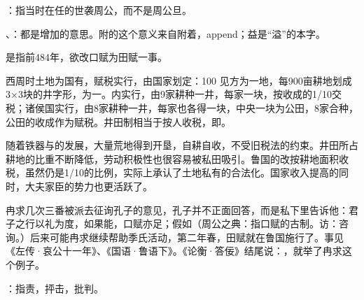 {
\item {}：指当时在任的世袭周公，而不是周公旦。
\item {}、：都是增加的意思。附的这个意义来自附着，append；益是“溢”的本字。

是指前484年，欲改口赋为田赋一事。

西周时土地为国有，赋税实行，由国家划定：100 见方为一地，每900亩耕地划成3×3块的井字形，为一。内实行，由9家耕种一井，每家一块，按收成的1/10交税；诸侯国实行，由8家耕种一井，每家也各得一块，中央一块为公田，8家合种，公田的收成作为赋税。井田制相当于按人收税，即。

随着铁器与的发展，大量荒地得到开垦，自耕自收，不受旧税法的约束。井田所占耕地的比重不断降低，劳动积极性也很容易被私田吸引。鲁国的改按耕地面积收税，虽然仍是1/10的比例，实际上承认了土地私有的合法化。国家收入提高的同时，大夫家臣的势力也更活跃了。

冉求几次三番被派去征询孔子的意见，孔子并不正面回答，而是私下里告诉他：君子之行以礼为度，如果能，口赋亦足；假如（周公之典：指口赋的古制。访：咨询。）后来可能冉求继续帮助季氏活动，第二年春，田赋就在鲁国施行了。事见《左传·哀公十一年》、《国语·鲁语下》。《论衡·答佞》结尾说：，就举了冉求这个例子。

\item {}：指责，抨击，批判。
}
{}


